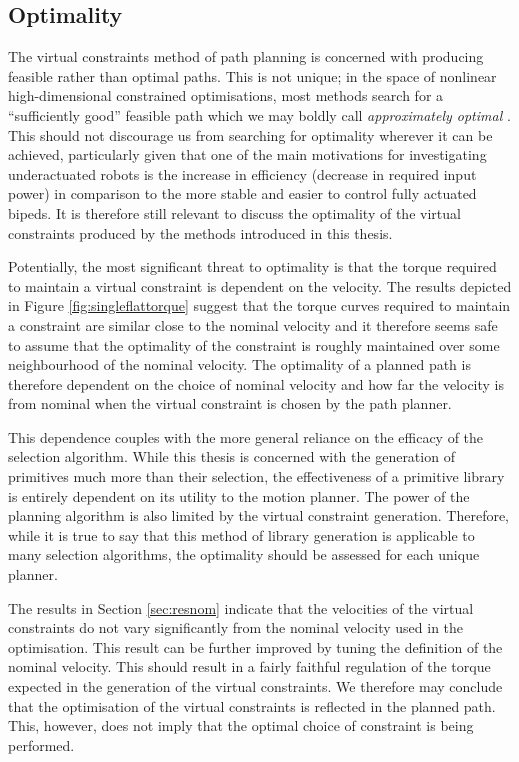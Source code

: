 \subsection{Optimality}
The virtual constraints method of path planning is concerned with producing feasible rather than optimal paths. This is not unique; in the space of nonlinear high-dimensional constrained optimisations, most methods search for a ``sufficiently good'' feasible path which we may boldly call \textit{approximately optimal} \cite{kavraki1996probabilistic, hwang1992potential, quinlan1993elastic}. This should not discourage us from searching for optimality wherever it can be achieved, particularly given that one of the main motivations for investigating underactuated robots is the increase in efficiency (decrease in required input power) in comparison to the more stable and easier to control fully actuated bipeds. It is therefore still relevant to discuss the optimality of the virtual constraints produced by the methods introduced in this thesis. 

Potentially, the most significant threat to optimality is that the torque required to maintain a virtual constraint is dependent on the velocity. The results depicted in Figure \ref{fig:singleflattorque} suggest that the torque curves required to maintain a constraint are similar close to the nominal velocity and it therefore seems safe to assume that the optimality of the constraint is roughly maintained over some neighbourhood of the nominal velocity. The optimality of a planned path is therefore dependent on the choice of nominal velocity and how far the velocity is from nominal when the virtual constraint is chosen by the path planner.

This dependence couples with the more general reliance on the efficacy of the selection algorithm. While this thesis is concerned with the generation of primitives much more than their selection, the effectiveness of a primitive library is entirely dependent on its utility to the motion planner. The power of the planning algorithm is also limited by the virtual constraint generation. Therefore, while it is true to say that this method of library generation is applicable to many selection algorithms, the optimality should be assessed for each unique planner.

The results in Section \ref{sec:resnom} indicate that the velocities of the virtual constraints do not vary significantly from the nominal velocity used in the optimisation. This result can be further improved by tuning the definition of the nominal velocity. This should result in a fairly faithful regulation of the torque expected in the generation of the virtual constraints. We therefore may conclude that the optimisation of the virtual constraints is reflected in the planned path. This, however, does not imply that the optimal choice of constraint is being performed.

